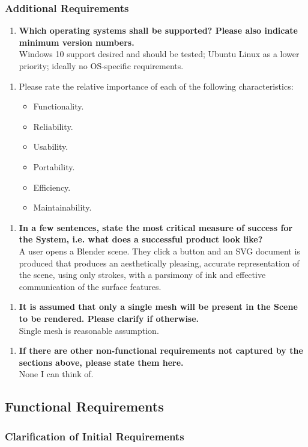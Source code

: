 \documentclass[a4paper,10pt]{article}
\newcommand{\Qq}[1]{\textbf{#1}}
\newcommand{\Qitemn}[2][]{
\begin{enumerate}[topsep=2pt,leftmargin=2.8em]
\item[\textit{N\arabic{nReqNum}#1.}] #2
\addtocounter{nReqNum}{10}
\end{enumerate}
}
\begin{document}
\subsubsection{Additional Requirements}

\Qitemn{\Qq{Which operating systems shall be supported? Please also indicate minimum version numbers.} \\
Windows 10 support desired and should be tested; Ubuntu Linux as a lower priority; ideally no OS-specific requirements.
}
\Qitemn{Please rate the relative importance of each of the following characteristics:
\begin{itemize}
\item Functionality.
\item Reliability.
\item Usability.
\item Portability.
\item Efficiency.
\item Maintainability.
\end{itemize}
}
\Qitemn{\Qq{In a few sentences, state the most critical measure of success for the System, i.e. what does a successful product look like?} \\ 
A user opens a Blender scene. 
They click a button and an SVG document is produced that produces an aesthetically pleasing, accurate representation of the scene, using only strokes, with a parsimony of ink and effective communication of the surface features.
}
\Qitemn{\Qq{It is assumed that only a single mesh will be present in the Scene to be rendered. Please clarify if otherwise.} \\ 
Single mesh is reasonable assumption.
}
\Qitemn{\Qq{If there are other non-functional requirements not captured by the sections above, please state them here.} \\ 
None I can think of.
}

\subsection{Functional Requirements}
\subsubsection{Clarification of Initial Requirements}
\end{document}

